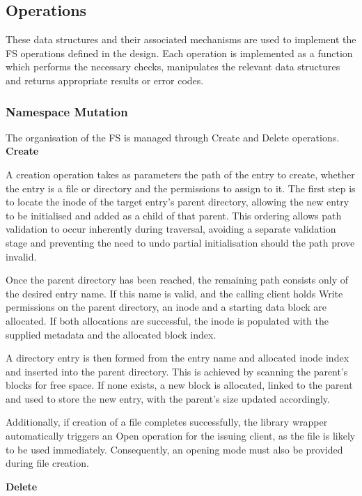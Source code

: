 \subsection{Operations}

These data structures and their associated mechanisms are used to implement the FS operations defined in the design. Each operation is implemented as a function which performs the necessary checks, manipulates the relevant data structures and returns appropriate results or error codes. 

\subsubsection{Namespace Mutation}

The organisation of the FS is managed through Create and Delete operations. 
\newpage
\textbf{Create}

A creation operation takes as parameters the path of the entry to create, whether the entry is a file or directory and the permissions to assign to it. The first step is to locate the inode of the target entry’s parent directory, allowing the new entry to be initialised and added as a child of that parent. This ordering allows path validation to occur inherently during traversal, avoiding a separate validation stage and preventing the need to undo partial initialisation should the path prove invalid. 

Once the parent directory has been reached, the remaining path consists only of the desired entry name. If this name is valid, and the calling client holds Write permissions on the parent directory, an inode and a starting data block are allocated. If both allocations are successful, the inode is populated with the supplied metadata and the allocated block index. 

A directory entry is then formed from the entry name and allocated inode index and inserted into the parent directory. This is achieved by scanning the parent’s blocks for free space. If none exists, a new block is allocated, linked to the parent and used to store the new entry, with the parent’s size updated accordingly. 

Additionally, if creation of a file completes successfully, the library wrapper automatically triggers an Open operation for the issuing client, as the file is likely to be used immediately. Consequently, an opening mode must also be provided during file creation. 

\textbf{Delete}

